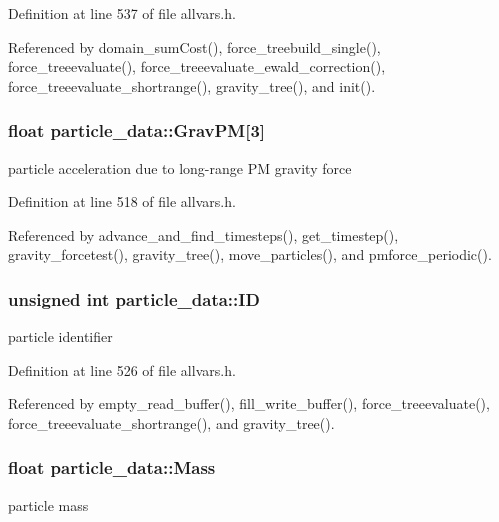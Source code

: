 Definition at line 537 of file allvars.h.



Referenced by domain\_\-sumCost(), force\_\-treebuild\_\-single(), force\_\-treeevaluate(), force\_\-treeevaluate\_\-ewald\_\-correction(), force\_\-treeevaluate\_\-shortrange(), gravity\_\-tree(), and init().

\hypertarget{structparticle__data_a66cad4fae4501e68c9be5f6c643a8798}{
\subsubsection[{GravPM}]{\setlength{\rightskip}{0pt plus 5cm}float {\bf particle\_\-data::GravPM}\mbox{[}3\mbox{]}}}
\label{structparticle__data_a66cad4fae4501e68c9be5f6c643a8798}
particle acceleration due to long-\/range PM gravity force 

Definition at line 518 of file allvars.h.



Referenced by advance\_\-and\_\-find\_\-timesteps(), get\_\-timestep(), gravity\_\-forcetest(), gravity\_\-tree(), move\_\-particles(), and pmforce\_\-periodic().

\hypertarget{structparticle__data_aefa92af245e44af30d28799ab1419e74}{
\subsubsection[{ID}]{\setlength{\rightskip}{0pt plus 5cm}unsigned int {\bf particle\_\-data::ID}}}
\label{structparticle__data_aefa92af245e44af30d28799ab1419e74}
particle identifier 

Definition at line 526 of file allvars.h.



Referenced by empty\_\-read\_\-buffer(), fill\_\-write\_\-buffer(), force\_\-treeevaluate(), force\_\-treeevaluate\_\-shortrange(), and gravity\_\-tree().

\hypertarget{structparticle__data_a710e551be01f4ef85442d0928aca728c}{
\subsubsection[{Mass}]{\setlength{\rightskip}{0pt plus 5cm}float {\bf particle\_\-data::Mass}}}
\label{structparticle__data_a710e551be01f4ef85442d0928aca728c}
particle mass 

